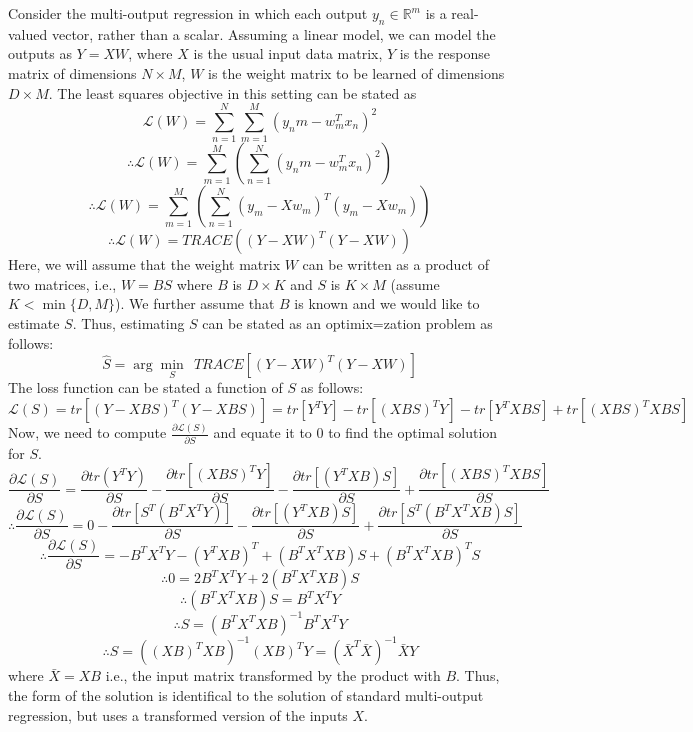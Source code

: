 \documentclass[a4paper,11pt]{article}
\begin{document}
\begin{mlsolution}

Consider the multi-output regression in which each output $y_n \in \mathbb{R}^{m}$ is a real-valued vector, rather than a scalar. Assuming a linear model, we can
model the outputs as $Y = XW$, where $X$ is the usual input data matrix, $Y$ is the response matrix of dimensions $N \times M$, $W$ is the weight matrix to be learned of dimensions $D \times M$. The least squares objective in this setting  can be stated as 
\[
\mathcal{L}(W) =  \sum_{n=1}^{N} \sum_{m=1}^{M} (y_nm - w^{T}_{m}x_n)^{2}
\]
\[
\therefore \mathcal{L}(W) =  \sum_{m=1}^{M} \left(\sum_{n=1}^{N} (y_nm - w^{T}_{m}x_n)^{2}\right)
\]
\[
\therefore \mathcal{L}(W) =  \sum_{m=1}^{M} \left(\sum_{n=1}^{N} (y_m - Xw_m)^{T}(y_m - Xw_m) \right)
\]
\[
\therefore \mathcal{L}(W) =  TRACE \left( (Y-XW)^{T}(Y-XW)  \right)
\]
Here, we will assume that the weight matrix $W$ can be written as a product of two matrices, i.e., $W = BS$ where $B$ is $D \times K$ and $S$ is $K \times M$ (assume $K < \min\{D, M \}$). We further assume that $B$ is known and we would like to estimate $S$. Thus, estimating $S$ can be stated as an optimix=zation problem as follows:
\[
\hat{S} = \arg\min_{S} \ \ TRACE [(Y-XW)^{T}(Y-XW)]
\]
The loss function can be stated a function of $S$ as follows:
\[
\mathcal{L}(S) = tr[(Y-XBS)^{T}(Y-XBS)] = tr[Y^{T}Y] - tr[(XBS)^{T}Y] - tr[Y^{T}XBS] + tr[(XBS)^{T}XBS]
\]
Now, we need to compute $\frac{\partial \mathcal{L}(S)}{\partial S}$ and equate it to $0$ to find the optimal solution for $S$.
\[
\frac{\partial \mathcal{L}(S)}{\partial S} = \frac{\partial tr(Y^{T}Y)}{\partial S} - \frac{\partial tr[(XBS)^{T}Y]}{\partial S} - \frac{\partial tr[(Y^{T}XB)S]}{\partial S} + \frac{\partial tr[(XBS)^{T}XBS]}{\partial S}
\]
\[
\therefore \frac{\partial \mathcal{L}(S)}{\partial S} = 0 - \frac{\partial tr[S^{T}(B^{T}X^{T}Y)]}{\partial S} - \frac{\partial tr[(Y^{T}XB)S]}{\partial S} + \frac{\partial tr[S^{T}(B^{T}X^{T}XB)S]}{\partial S}
\]
\[
\therefore \frac{\partial \mathcal{L}(S)}{\partial S} = -B^{T}X^{T}Y - (Y^{T}XB)^{T} + (B^{T}X^{T}XB)S + (B^{T}X^{T}XB)^{T}S
\]
\[
\therefore 0 = 2 B^{T}X^{T}Y + 2(B^{T}X^{T}XB)S
\]
\[
\therefore  (B^{T}X^{T}XB)S = B^{T}X^{T}Y
\]
\[
\therefore  S = (B^{T}X^{T}XB)^{-1}B^{T}X^{T}Y
\]
\[
\boxed{\therefore  S = ((XB)^{T}XB)^{-1}(XB)^{T}Y = (\bar{X}^{T}\bar{X})^{-1}\bar{X}Y}
\]
where $\bar{X} = XB$ i.e., the input matrix transformed by the product with $B$. Thus, the form of the solution is identifical to the solution of standard multi-output regression, but uses a transformed version of the inputs $X$. 
\end{mlsolution}
\end{document}
